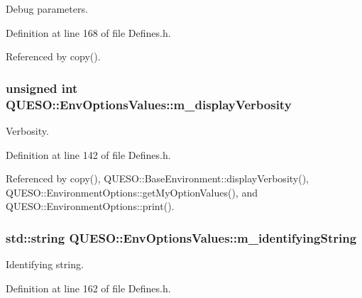 Debug parameters. 



Definition at line 168 of file Defines.\-h.



Referenced by copy().

\hypertarget{class_q_u_e_s_o_1_1_env_options_values_aacf4ef43ac39a6118ca3e9bb7f0f8414}{
\subsubsection[{m\-\_\-display\-Verbosity}]{\setlength{\rightskip}{0pt plus 5cm}unsigned int Q\-U\-E\-S\-O\-::\-Env\-Options\-Values\-::m\-\_\-display\-Verbosity}}\label{class_q_u_e_s_o_1_1_env_options_values_aacf4ef43ac39a6118ca3e9bb7f0f8414}


Verbosity. 



Definition at line 142 of file Defines.\-h.



Referenced by copy(), Q\-U\-E\-S\-O\-::\-Base\-Environment\-::display\-Verbosity(), Q\-U\-E\-S\-O\-::\-Environment\-Options\-::get\-My\-Option\-Values(), and Q\-U\-E\-S\-O\-::\-Environment\-Options\-::print().

\hypertarget{class_q_u_e_s_o_1_1_env_options_values_a4d704b461389c12e658e1e5e811ccb18}{
\subsubsection[{m\-\_\-identifying\-String}]{\setlength{\rightskip}{0pt plus 5cm}std\-::string Q\-U\-E\-S\-O\-::\-Env\-Options\-Values\-::m\-\_\-identifying\-String}}\label{class_q_u_e_s_o_1_1_env_options_values_a4d704b461389c12e658e1e5e811ccb18}


Identifying string. 



Definition at line 162 of file Defines.\-h.



